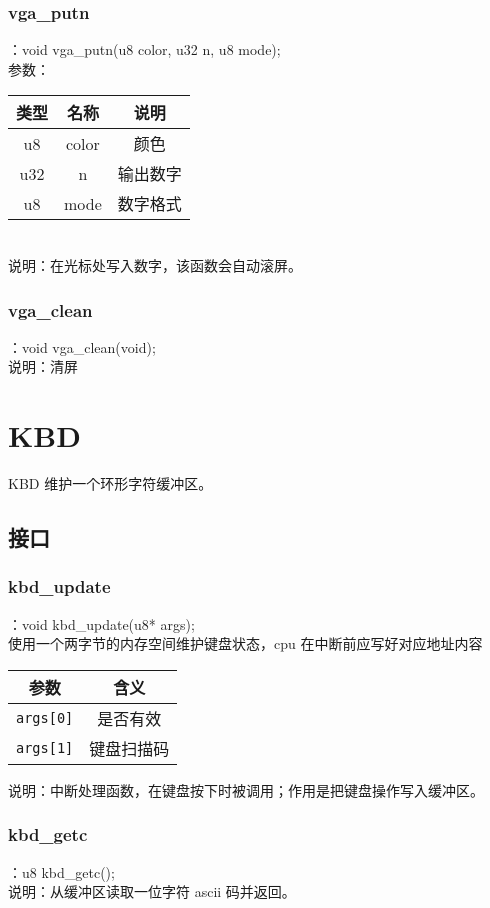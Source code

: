 \subsubsection{vga\_putn}
：void vga\_putn(u8 color, u32 n, u8 mode);\\
参数：\\
\begin{tabular}{|c|c|c|}
    \hline
    类型 & 名称 & 说明\\\hline
    u8 & color & 颜色\\\hline
    u32 & n & 输出数字\\\hline
    u8 & mode & 数字格式\\\hline
\end{tabular}\\
说明：在光标处写入数字，该函数会自动滚屏。

\subsubsection{vga\_clean}
：void vga\_clean(void);\\
说明：清屏

\section{KBD}
KBD 维护一个环形字符缓冲区。

\subsection{接口}

\subsubsection{kbd\_update}
：void kbd\_update(u8* args);\\

使用一个两字节的内存空间维护键盘状态，cpu 在中断前应写好对应地址内容

\begin{tabular}{|c|c|}
    \hline
    参数 & 含义 \\\hline
    \texttt{args[0]} & 是否有效 \\\hline
    \texttt{args[1]} & 键盘扫描码 \\\hline
\end{tabular}

说明：中断处理函数，在键盘按下时被调用；作用是把键盘操作写入缓冲区。

\subsubsection{kbd\_getc}
：u8 kbd\_getc();\\
说明：从缓冲区读取一位字符 ascii 码并返回。
